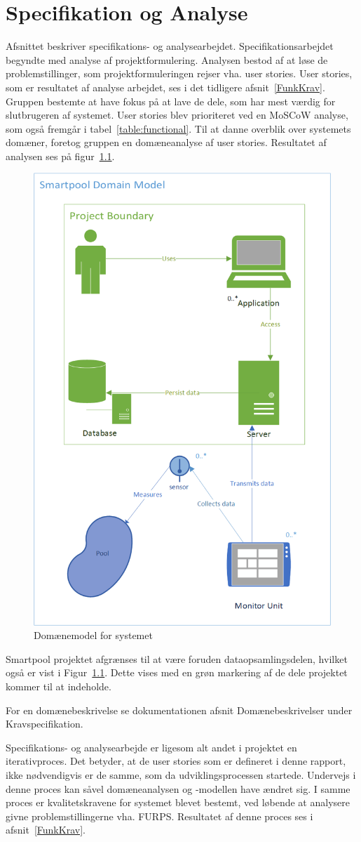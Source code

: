 \chapter{Specifikation og Analyse}\label{SpecOgAnalyse}
Afsnittet beskriver specifikations- og analysearbejdet. Specifikationsarbejdet begyndte med analyse af projektformulering. Analysen bestod af at løse de problemstillinger, som projektformuleringen rejser vha. user stories. User stories, som er resultatet af analyse arbejdet, ses i det tidligere afsnit~\ref{FunkKrav}. Gruppen bestemte at have fokus på at lave de dele, som har mest værdig for slutbrugeren af systemet. User stories blev prioriteret ved en MoSCoW analyse, som også fremgår i tabel~\ref{table:functional}. Til at danne overblik over systemets domæner, foretog gruppen en domæneanalyse af user stories. Resultatet af analysen ses på figur~\ref{fig:domainmodelboundary}.

\begin{figure}
	\centering
	\includegraphics[width=0.65\linewidth]{figs/ProjectBoundary}
	\caption{Domænemodel for systemet}
	\label{fig:domainmodelboundary}
\end{figure}

Smartpool projektet afgrænses til at være foruden dataopsamlingsdelen, hvilket også er vist i Figur~\ref{fig:domainmodelboundary}. Dette vises med en grøn markering af de dele projektet kommer til at indeholde.

For en domænebeskrivelse se dokumentationen afsnit Domænebeskrivelser under Kravspecifikation.

Specifikations- og analysearbejde er ligesom alt andet i projektet en iterativproces. Det betyder, at de user stories som er defineret i denne rapport, ikke nødvendigvis er de samme, som da udviklingsprocessen startede. Undervejs i denne proces kan såvel domæneanalysen og -modellen have ændret sig. I samme proces er kvalitetskravene for systemet blevet bestemt, ved løbende at analysere givne problemstillingerne vha. FURPS. Resultatet af denne proces ses i afsnit~\ref{FunkKrav}.